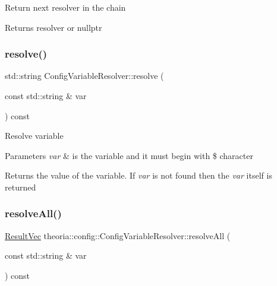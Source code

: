 Return next resolver in the chain \begin{DoxyReturn}{Returns}
resolver or nullptr 
\end{DoxyReturn}
\mbox{\label{classtheoria_1_1config_1_1ConfigVariableResolver_acb155f953e0d353cbd4966ae0d6e50da}} 
\subsubsection{\texorpdfstring{resolve()}{resolve()}}
{\footnotesize\ttfamily std\+::string Config\+Variable\+Resolver\+::resolve (\begin{DoxyParamCaption}\item[{const std\+::string \&}]{var }\end{DoxyParamCaption}) const}

Resolve variable 
\begin{DoxyParams}{Parameters}
{\em var} & is the variable and it must begin with \textquotesingle{}\$\textquotesingle{} character\\
\hline
\end{DoxyParams}
\begin{DoxyReturn}{Returns}
the value of the variable. If {\itshape var} is not found then the {\itshape var} itself is returned 
\end{DoxyReturn}
\mbox{\label{classtheoria_1_1config_1_1ConfigVariableResolver_a406e1024b865b1749c920c83b774b745}} 
\subsubsection{\texorpdfstring{resolve\+All()}{resolveAll()}}
{\footnotesize\ttfamily \hyperlink{classtheoria_1_1config_1_1ConfigVariableResolver_a2d92a11d55181183ce4071566437f01b}{Result\+Vec} theoria\+::config\+::\+Config\+Variable\+Resolver\+::resolve\+All (\begin{DoxyParamCaption}\item[{const std\+::string \&}]{var }\end{DoxyParamCaption}) const}

